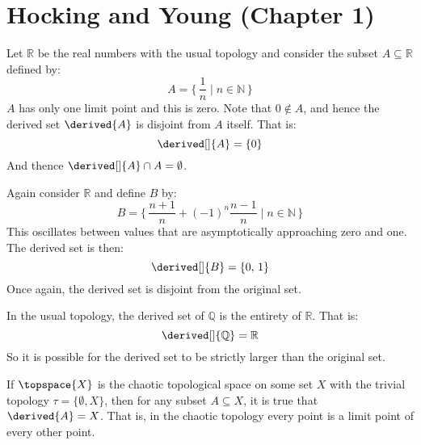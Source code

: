 \section{Hocking and Young (Chapter 1)}
    \begin{example}
        Let $\mathbb{R}$ be the real numbers with the usual topology and
        consider the subset $A\subseteq\mathbb{R}$ defined by:
        \begin{equation}
            A=\Big\{\,\frac{1}{n}\;|\;n\in\mathbb{N}\,\Big\}
        \end{equation}
        $A$ has only one limit point and this is zero. Note that
        $0\notin{A}$, and hence the derived set $\derived{A}$ is disjoint
        from $A$ itself. That is:
        \begin{equation}
            \derived[]{A}=\{0\}
        \end{equation}
        And thence $\derived[]{A}\cap{A}=\emptyset$.
    \end{example}
    \begin{example}
        Again consider $\mathbb{R}$ and define $B$ by:
        \begin{equation}
            B=\Big\{\,\frac{n+1}{n}+(\minus{1})^{n}\frac{n-1}{n}\;|\;
                n\in\mathbb{N}\,\Big\}
        \end{equation}
        This oscillates between values that are asymptotically approaching
        zero and one. The derived set is then:
        \begin{equation}
            \derived[]{B}=\{0,\,1\}
        \end{equation}
        Once again, the derived set is disjoint from the original set.
    \end{example}
    \begin{example}
        In the usual topology, the derived set of $\mathbb{Q}$ is the
        entirety of $\mathbb{R}$. That is:
        \begin{equation}
            \derived[]{\mathbb{Q}}=\mathbb{R}
        \end{equation}
        So it is possible for the derived set to be strictly larger than the
        original set.
    \end{example}
    \begin{example}
        If $\topspace{X}$ is the chaotic topological space on some set $X$
        with the trivial topology $\tau=\{\emptyset,X\}$, then for any
        subset $A\subseteq{X}$, it is true that $\derived{A}=X$. That is,
        in the chaotic topology every point is a limit point of every other
        point.
    \end{example}
